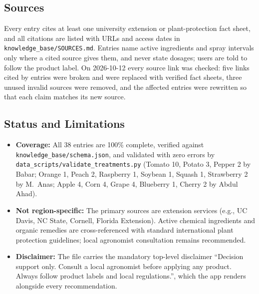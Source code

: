 \subsection{Sources}
Every entry cites at least one university extension or plant-protection fact sheet, and all citations are listed with URLs and access dates in \texttt{knowledge\_base/SOURCES.md}. Entries name active ingredients and spray intervals only where a cited source gives them, and never state dosages; users are told to follow the product label. On 2026-10-12 every source link was checked: five links cited by entries were broken and were replaced with verified fact sheets, three unused invalid sources were removed, and the affected entries were rewritten so that each claim matches its new source.

\subsection{Status and Limitations}
\begin{itemize}
    \item \textbf{Coverage:} All 38 entries are 100\% complete, verified against \texttt{knowledge\_base/schema.json}, and validated with zero errors by \texttt{data\_scripts/validate\_treatments.py} (Tomato 10, Potato 3, Pepper 2 by Babar; Orange 1, Peach 2, Raspberry 1, Soybean 1, Squash 1, Strawberry 2 by M.~Anas; Apple 4, Corn 4, Grape 4, Blueberry 1, Cherry 2 by Abdul Ahad).
    \item \textbf{Not region-specific:} The primary sources are extension services (e.g., UC Davis, NC State, Cornell, Florida Extension). Active chemical ingredients and organic remedies are cross-referenced with standard international plant protection guidelines; local agronomist consultation remains recommended.
    \item \textbf{Disclaimer:} The file carries the mandatory top-level disclaimer ``Decision support only. Consult a local agronomist before applying any product. Always follow product labels and local regulations.'', which the app renders alongside every recommendation.
\end{itemize}
